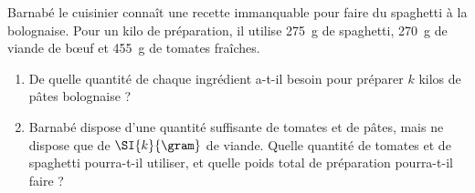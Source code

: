 
\begin{exercice}\label{exo2smath-0111}

    Barnabé le cuisinier connaît une recette immanquable pour faire du spaghetti à la bolognaise. Pour un kilo de préparation, il utilise \SI{275}{\gram} de spaghetti, \SI{270}{\gram} de viande de bœuf et \SI{455}{\gram} de tomates fraîches.

    \begin{enumerate}
        \item
            De quelle quantité de chaque ingrédient a-t-il besoin pour préparer \( k\) kilos de pâtes bolognaise ?
        \item
            Barnabé dispose d'une quantité suffisante de tomates et de pâtes, mais ne dispose que de \( \SI{k}{\gram}\) de viande. Quelle quantité de tomates et de spaghetti pourra-t-il utiliser, et quelle poids total de préparation pourra-t-il faire ?
    \end{enumerate}

\end{exercice}
